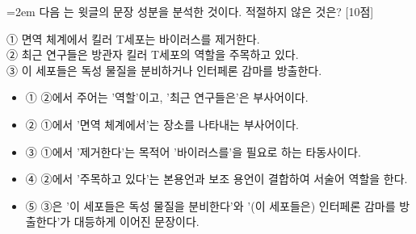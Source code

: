 \documentclass[10pt,a4paper]{article}
\newcommand{\qnum}[1]{%
  \tikz[baseline=(num.base)]{%
    \node[circle, fill=numCircle, text=white, inner sep=0pt,
          minimum size=18pt, font=\small\bfseries] (num) {#1};%
  }%
}
\newcommand{\pts}[1]{%
  \hfill\textcolor{ptsBadge}{[#1점]}%
}
\begin{document}
\vspace{4mm}
\begin{minipage}{\columnwidth}
{\hangindent=2em
\qnum{44}\enspace 다음 는 윗글의 문장 성분을 분석한 것이다. 적절하지 않은 것은? \pts{10}
\par}

\vspace{3mm}
\begin{tcolorbox}[bogi]
① 면역 체계에서 킬러 T세포는 바이러스를 제거한다. \\{}
② 최근 연구들은 방관자 킬러 T세포의 역할을 주목하고 있다. \\{}
③ 이 세포들은 독성 물질을 분비하거나 인터페론 감마를 방출한다.
\end{tcolorbox}
\vspace{3mm}
\begin{itemize}[leftmargin=2.5em, labelsep=0.3em, label={}, itemsep=4pt, parsep=1pt, topsep=0pt]
  \item ① ②에서 주어는 '역할'이고, '최근 연구들은'은 부사어이다.
  \item ② ①에서 '면역 체계에서'는 장소를 나타내는 부사어이다.
  \item ③ ①에서 '제거한다'는 목적어 '바이러스를'을 필요로 하는 타동사이다.
  \item ④ ②에서 '주목하고 있다'는 본용언과 보조 용언이 결합하여 서술어 역할을 한다.
  \item ⑤ ③은 '이 세포들은 독성 물질을 분비한다'와 '(이 세포들은) 인터페론 감마를 방출한다'가 대등하게 이어진 문장이다.
\end{itemize}
\end{minipage}
\vspace{4mm}
\end{document}
